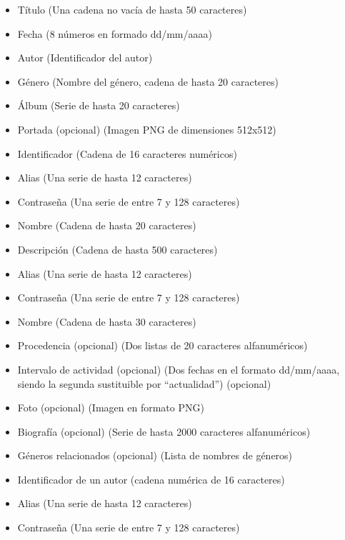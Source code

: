 
\begin{itemize}
  \item Título (Una cadena no vacía de hasta 50 caracteres)
  \item Fecha (8 números en formado dd/mm/aaaa)
  \item Autor (Identificador del autor)
  \item Género (Nombre del género, cadena de hasta 20 caracteres)
  \item Álbum (Serie de hasta 20 caracteres)
  \item Portada (opcional) (Imagen PNG de dimensiones 512x512)
  \item Identificador (Cadena de 16 caracteres numéricos)
  \item Alias (Una serie de hasta 12 caracteres)
  \item Contraseña (Una serie de entre 7 y 128 caracteres)
\end{itemize}

\begin{itemize}
  \item Nombre (Cadena de hasta 20 caracteres)
  \item Descripción (Cadena de hasta 500 caracteres)
  \item Alias (Una serie de hasta 12 caracteres)
  \item Contraseña (Una serie de entre 7 y 128 caracteres)
\end{itemize}


\begin{itemize}
  \item Nombre (Cadena de hasta 30 caracteres)
  \item Procedencia (opcional) (Dos listas de 20 caracteres alfanuméricos)
  \item Intervalo de actividad (opcional) (Dos fechas en el formato dd/mm/aaaa, siendo la segunda sustituible por ``actualidad'') (opcional)
  \item Foto (opcional) (Imagen en formato PNG)
  \item Biografía (opcional) (Serie de hasta 2000 caracteres alfanuméricos)
    \item Géneros relacionados (opcional) (Lista de nombres de géneros)
    \item Identificador de un autor (cadena numérica de 16 caracteres)
    \item Alias (Una serie de hasta 12 caracteres)
    \item Contraseña (Una serie de entre 7 y 128 caracteres)
\end{itemize}

